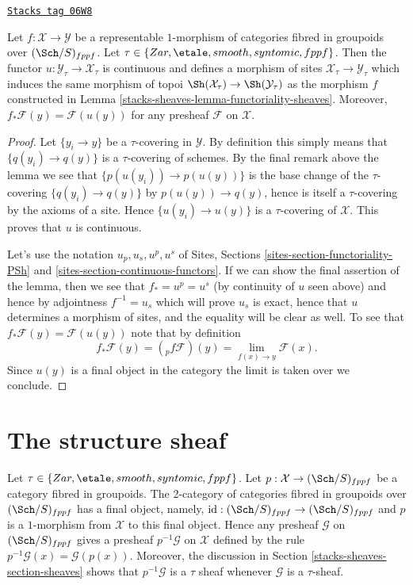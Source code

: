 \begin{lemma}
\label{stacks-sheaves-lemma-representable-pushforward}
\href{https://stacks.math.columbia.edu/tag/06W8}{\texttt{Stacks tag 06W8}}

Let $f : \mathcal{X} \to \mathcal{Y}$ be a representable $1$-morphism of
categories fibred in groupoids over $(\Sch/S)_{fppf}$. Let
$\tau \in \{Zar, \etale, smooth, syntomic, fppf\}$.
Then the functor $u : \mathcal{Y}_\tau \to \mathcal{X}_\tau$ is continuous
and defines a morphism of sites $\mathcal{X}_\tau \to \mathcal{Y}_\tau$
which induces the same morphism of topoi
$\Sh(\mathcal{X}_\tau) \to \Sh(\mathcal{Y}_\tau)$
as the morphism $f$ constructed in
Lemma \ref{stacks-sheaves-lemma-functoriality-sheaves}.
Moreover, $f_*\mathcal{F}(y) = \mathcal{F}(u(y))$ for any presheaf
$\mathcal{F}$ on $\mathcal{X}$.
\end{lemma}

\begin{proof}
Let $\{y_i \to y\}$ be a $\tau$-covering in $\mathcal{Y}$. By definition
this simply means that $\{q(y_i) \to q(y)\}$ is a $\tau$-covering of
schemes. By the final remark above the lemma we see that
$\{p(u(y_i)) \to p(u(y))\}$ is the base change of the $\tau$-covering
$\{q(y_i) \to q(y)\}$ by $p(u(y)) \to q(y)$, hence is itself a
$\tau$-covering by the axioms of a site. Hence $\{u(y_i) \to u(y)\}$
is a $\tau$-covering of $\mathcal{X}$. This proves that $u$ is
continuous.

\medskip\noindent
Let's use the notation $u_p, u_s, u^p, u^s$ of
Sites, Sections \ref{sites-section-functoriality-PSh} and
\ref{sites-section-continuous-functors}.
If we can show the final assertion of the lemma, then we see that
$f_* = u^p = u^s$ (by continuity of $u$ seen above) and hence by adjointness
$f^{-1} = u_s$ which will prove $u_s$ is exact, hence that $u$ determines
a morphism of sites, and the equality will be clear as well.
To see that $f_*\mathcal{F}(y) = \mathcal{F}(u(y))$ note that by
definition
$$
f_*\mathcal{F}(y) = ({}_pf\mathcal{F})(y) =
\lim_{f(x) \to y} \mathcal{F}(x).
$$
Since $u(y)$ is a final object in the category the limit is taken
over we conclude.
\end{proof}

\section{The structure sheaf}
\label{stacks-sheaves-section-structure-sheaf}
Let $\tau \in \{Zar, \etale, smooth, syntomic, fppf\}$.
Let $p : \mathcal{X} \to (\Sch/S)_{fppf}$ be a category
fibred in groupoids. The 2-category of categories fibred in groupoids over
$(\Sch/S)_{fppf}$ has a final object, namely,
$\text{id} : (\Sch/S)_{fppf} \to (\Sch/S)_{fppf}$
and $p$ is a $1$-morphism from $\mathcal{X}$ to this final object.
Hence any presheaf $\mathcal{G}$ on $(\Sch/S)_{fppf}$ gives a
presheaf $p^{-1}\mathcal{G}$ on $\mathcal{X}$ defined by the rule
$p^{-1}\mathcal{G}(x) = \mathcal{G}(p(x))$. Moreover, the discussion in
Section \ref{stacks-sheaves-section-sheaves}
shows that $p^{-1}\mathcal{G}$ is a $\tau$ sheaf whenever
$\mathcal{G}$ is a $\tau$-sheaf.

